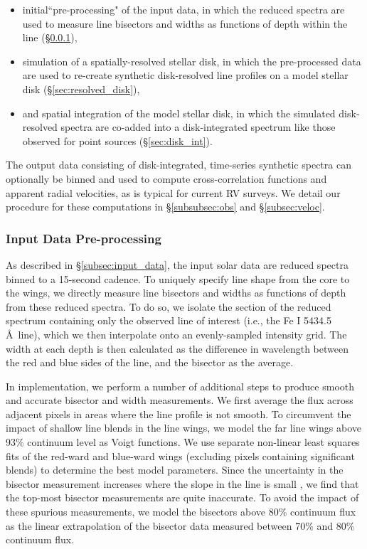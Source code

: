 \documentclass[twocolumn]{aastex63}
\newcommand{\revise}[1]{#1}
\begin{document}
\begin{itemize}
    \item initial``pre-processing" of the input data, in which the reduced spectra are used to \revise{measure line bisectors and widths} as functions of depth within the line (\S \ref{subsubsec:preprocess}),
    \item simulation of a spatially-resolved stellar disk, in which the pre-processed data are used to re-create synthetic disk-resolved line profiles on a model stellar disk (\S\ref{sec:resolved_disk}),
    \item and spatial integration of the model stellar disk, in which the simulated disk-resolved spectra are co-added into a disk-integrated spectrum like those observed for point sources (\S\ref{sec:disk_int}).
\end{itemize}

The output data consisting of disk-integrated, time-series synthetic spectra can optionally be binned and used to compute cross-correlation functions and apparent radial velocities, as is typical for current RV surveys. We detail our procedure for these computations in \S\ref{subsubsec:obs} and \S\ref{subsec:veloc}. \par 

\subsubsection{Input Data Pre-processing}
\label{subsubsec:preprocess}

% 

As described in \S\ref{subsec:input_data}, the input solar data are reduced spectra binned to a 15-second cadence. To uniquely specify line shape from the core to the wings, we directly measure line bisectors and widths as functions of depth from these reduced spectra. To do so, we isolate the section of the reduced spectrum containing only the observed line of interest (i.e., the Fe \textsc{I} 5434.5 \AA\ line), which we then interpolate onto an evenly-sampled intensity grid. The width at each depth is then calculated as the difference in wavelength between the red and blue sides of the line, and the bisector as the average. \par

In implementation, we perform a number of additional steps to produce smooth and accurate bisector and width measurements. We first average the flux across adjacent pixels in areas where the line profile is not smooth. To circumvent the impact of shallow line blends in the line wings, we model the far line wings above 93\% continuum level as Voigt functions. We use separate non-linear least squares fits of the red-ward and blue-ward wings (excluding pixels containing significant blends) to determine the best model parameters. Since the uncertainty in the bisector measurement increases where the slope in the line is small \citep{Gray2008}, we find that the top-most bisector measurements are quite inaccurate. To avoid the impact of these spurious measurements, we model the bisectors above 80\% continuum flux as the linear extrapolation of the bisector data measured between 70\% and 80\% continuum flux. \par 
\end{document}
